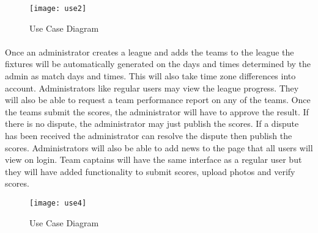 \documentclass[11pt]{article}
\begin{document}
\begin{figure}[t]
\caption{Use Case Diagram }
\centering
\hspace*{-2cm}\texttt{[image: use2]}
\end{figure}

\paragraph{}
Once an administrator creates a league and adds the teams to the league the fixtures will be automatically generated on the days and times determined by the admin as match days and times. This will also take time zone differences into account. Administrators like regular users may view the league progress. They will also be able to request a team performance report on any of the teams. Once the teams submit the scores, the administrator will have to approve the result. If there is no dispute, the administrator may just publish the scores. If a dispute has been received the administrator can resolve the dispute then publish the scores. Administrators will also be able to add news to the page that all users will view on login. Team captains will have the same interface as a regular user but they will have added functionality to submit scores, upload photos and verify scores.	



\begin{figure}[t]
\caption{Use Case Diagram }
\centering
\hspace*{-2cm}\texttt{[image: use4]}
\end{figure}	
\end{document}

